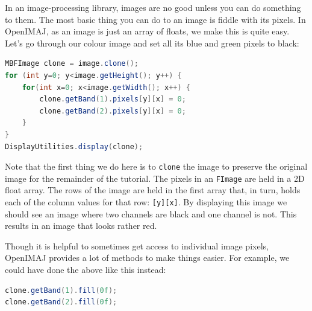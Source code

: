 In an image-processing library, images are no good unless you can do something to them. The most basic 
thing you can do to an image is fiddle with its pixels. In OpenIMAJ, as an image is just an array of 
floats, we make this is quite easy. Let's go through our colour image and set all its blue and green 
pixels to black: 
\begin{lstlisting}[language=java]
MBFImage clone = image.clone();
for (int y=0; y<image.getHeight(); y++) {
    for(int x=0; x<image.getWidth(); x++) {
        clone.getBand(1).pixels[y][x] = 0;
        clone.getBand(2).pixels[y][x] = 0;
    }
}
DisplayUtilities.display(clone);
\end{lstlisting}
Note that the first thing we do here is to \verb+clone+ the image to preserve the original image
for the remainder of the tutorial. The pixels in an \verb+FImage+ are held in a 2D float array. The rows 
of the image are held in the first array that, in turn, holds each of the column values for that 
row:  \verb+[y][x]+. By displaying this image we should see an image where two channels are black 
and one channel is not. This results in an image that looks rather red. 

Though it is helpful to sometimes get access to individual image pixels, OpenIMAJ provides a lot 
of methods to make things easier. For example, we could have done the above like this instead:
\begin{lstlisting}[language=java]
clone.getBand(1).fill(0f);
clone.getBand(2).fill(0f);
\end{lstlisting}

